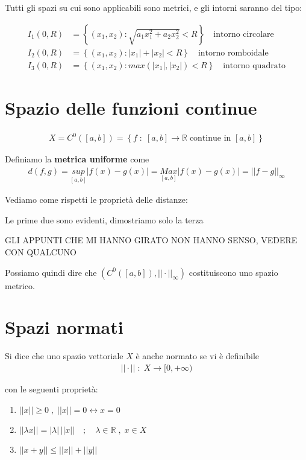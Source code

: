 Tutti gli spazi su cui sono applicabili sono metrici, e gli intorni saranno del tipo:

\begin{align}
I_1(0,R) {}&= \left\{ (x_1,x_2) : \sqrt{a_1 x_1^2 + a_2 x_2^2} < R \right\} \quad \text{intorno circolare}\\
I_2(0,R) &= \left\{ (x_1,x_2) : |x_1| + |x_2|  < R
\right\} \quad \text{intorno romboidale} \\
I_3(0,R)&= \left\{ (x_1,x_2) : max(|x_1| , |x_2|)  < R
\right\}  \quad \text{intorno quadrato}
\end{align}

\section{Spazio delle funzioni continue}

\begin{align}
X= C^0([a,b])= \left\{ f \; : \; [a,b] \rightarrow \mathbb{R} \; \text{continue in } [a,b]
\right\}
\end{align}

Definiamo la \textbf{metrica uniforme} come
\begin{align}
d(f,g) = \underset{[a,b]}{sup}|f(x) - g(x)| = \underset{[a,b]}{Max}|f(x) - g(x)|= ||f-g||_\infty
\end{align}

Vediamo come rispetti le proprietà delle distanze:

Le prime due sono evidenti, dimostriamo solo la terza

GLI APPUNTI CHE MI HANNO GIRATO NON HANNO SENSO, VEDERE CON QUALCUNO

\bigskip

Possiamo quindi dire che $(C^0([a,b]), ||\cdot||_\infty)$ costituiscono uno spazio metrico.

\section{Spazi normati}

Si dice che uno spazio vettoriale $X$ è anche normato se vi è definibile
\begin{align}
||\cdot|| \; : \; X \rightarrow [0, +\infty)
\end{align}

con le seguenti proprietà:

\begin{enumerate}
	\item $||x|| \geq 0 \; , \; ||x||=0 \leftrightarrow x=0$
	\item $||\lambda x||= |\lambda| \, ||x|| \quad ; \quad \lambda \in \mathbb{R} \; , \; x \in X$
	\item $||x+y|| \leq ||x|| + ||y||$
\end{enumerate}

